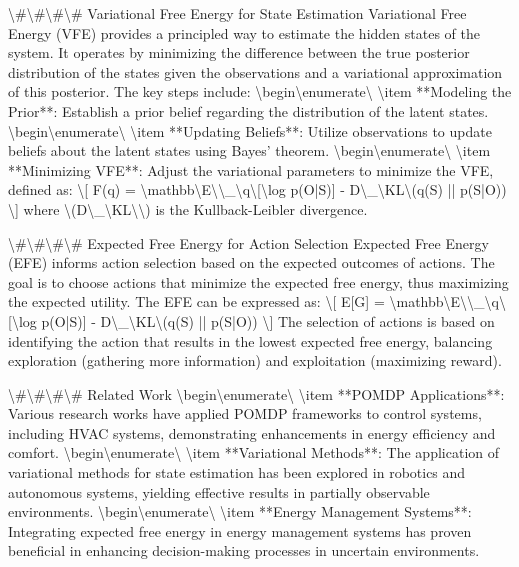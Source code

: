 \documentclass[11pt,a4paper]{article}
\begin{document}
\textbackslash{}#\textbackslash{}#\textbackslash{}#\textbackslash{}# Variational Free Energy for State Estimation
Variational Free Energy (VFE) provides a principled way to estimate the hidden states of the system. It operates by minimizing the difference between the true posterior distribution of the states given the observations and a variational approximation of this posterior. The key steps include:
\textbackslash{}begin\textbackslash{}{enumerate\textbackslash{}}
\textbackslash{}item **Modeling the Prior**: Establish a prior belief regarding the distribution of the latent states.
\textbackslash{}begin\textbackslash{}{enumerate\textbackslash{}}
\textbackslash{}item **Updating Beliefs**: Utilize observations to update beliefs about the latent states using Bayes' theorem.
\textbackslash{}begin\textbackslash{}{enumerate\textbackslash{}}
\textbackslash{}item **Minimizing VFE**: Adjust the variational parameters to minimize the VFE, defined as:
   \textbackslash{}[
   F(q) = \textbackslash{}mathbb\textbackslash{}{E\textbackslash{}}\textbackslash{}_\textbackslash{}{q\textbackslash{}}[\textbackslash{}log p(O|S)] - D\textbackslash{}_\textbackslash{}{KL\textbackslash{}}(q(S) || p(S|O))
   \textbackslash{}]
   where \textbackslash{}(D\textbackslash{}_\textbackslash{}{KL\textbackslash{}}\textbackslash{}) is the Kullback-Leibler divergence.

\textbackslash{}#\textbackslash{}#\textbackslash{}#\textbackslash{}# Expected Free Energy for Action Selection
Expected Free Energy (EFE) informs action selection based on the expected outcomes of actions. The goal is to choose actions that minimize the expected free energy, thus maximizing the expected utility. The EFE can be expressed as:
\textbackslash{}[
E[G] = \textbackslash{}mathbb\textbackslash{}{E\textbackslash{}}\textbackslash{}_\textbackslash{}{q\textbackslash{}}[\textbackslash{}log p(O|S)] - D\textbackslash{}_\textbackslash{}{KL\textbackslash{}}(q(S) || p(S|O))
\textbackslash{}]
The selection of actions is based on identifying the action that results in the lowest expected free energy, balancing exploration (gathering more information) and exploitation (maximizing reward).

\textbackslash{}#\textbackslash{}#\textbackslash{}#\textbackslash{}# Related Work
\textbackslash{}begin\textbackslash{}{enumerate\textbackslash{}}
\textbackslash{}item **POMDP Applications**: Various research works have applied POMDP frameworks to control systems, including HVAC systems, demonstrating enhancements in energy efficiency and comfort.
\textbackslash{}begin\textbackslash{}{enumerate\textbackslash{}}
\textbackslash{}item **Variational Methods**: The application of variational methods for state estimation has been explored in robotics and autonomous systems, yielding effective results in partially observable environments.
\textbackslash{}begin\textbackslash{}{enumerate\textbackslash{}}
\textbackslash{}item **Energy Management Systems**: Integrating expected free energy in energy management systems has proven beneficial in enhancing decision-making processes in uncertain environments.
\end{document}
